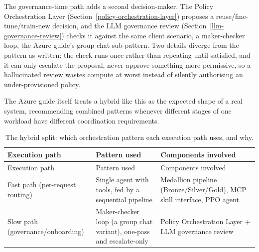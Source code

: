 The governance-time path adds a second decision-maker. The Policy
Orchestration Layer (Section~\ref{policy-orchestration-layer})
proposes a reuse/fine-tune/train-new decision, and the LLM governance
review (Section~\ref{llm-governance-review}) checks it against the
same client scenario, a maker-checker loop, the Azure guide's group
chat sub-pattern. Two details diverge from the pattern as written: the
check runs once rather than repeating until satisfied, and it can only
escalate the proposal, never approve something more permissive, so a
hallucinated review wastes compute at worst instead of silently
authorising an under-provisioned policy.

The Azure guide itself treats a hybrid like this as the expected shape
of a real system, recommending combined patterns whenever different
stages of one workload have different coordination requirements.

{\small\setlength{\tabcolsep}{4pt}
\begin{longtable}{p{2.6cm}p{3.6cm}p{6.8cm}}
\caption{The hybrid split: which orchestration pattern each execution
path uses, and why.}\label{tab:orchestration-hybrid}\\
\toprule Execution path & Pattern used & Components involved \\
\midrule \endfirsthead
\toprule Execution path & Pattern used & Components involved \\
\midrule \endhead
Fast path (per-request routing) & Single agent with tools, fed by a
sequential pipeline & Medallion pipeline (Bronze/Silver/Gold), MCP
skill interface, PPO agent \\
Slow path (governance/onboarding) & Maker-checker loop (a group chat
variant), one-pass and escalate-only & Policy Orchestration Layer +
LLM governance review \\
\bottomrule \end{longtable}}
